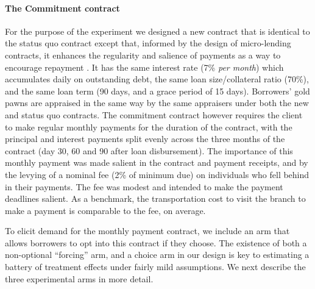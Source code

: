 \documentclass[12pt, a4paper]{article}
\begin{document}
\paragraph*{The Commitment contract} For the purpose of the experiment we designed a new contract that is identical to the status quo contract except that, informed by the design of micro-lending contracts, it enhances the regularity and salience of payments as a way to encourage repayment \citep{morduch1999microfinance, bauer2012behavioral}.  It has the same interest rate (7\% \textit{per month}) which accumulates daily on outstanding debt, the same loan size/collateral ratio (70\%), and the same loan term (90 days, and a grace period of 15 days). Borrowers' gold pawns are appraised in the same way by the same appraisers under both the new and status quo contracts. The commitment contract however requires the client to make regular monthly payments for the duration of the contract, with the principal and interest payments split evenly across the three months of the contract (day 30, 60 and 90 after loan disbursement). The importance of this monthly payment was made salient in the contract and payment receipts, and by the levying of a nominal fee (2\% of minimum due) on individuals who fell behind in their payments. %
The fee was modest and intended to make the payment deadlines salient. As a benchmark, the transportation cost to visit the branch to make a payment is comparable to the fee, on average.

To elicit demand for the monthly payment contract, we include an arm that allows borrowers to opt into this contract if they choose. The existence of both a non-optional ``forcing'' arm, and a choice arm in our design is key to estimating a battery of treatment effects under fairly mild assumptions. We next describe the three experimental arms in more detail. 
\end{document}
